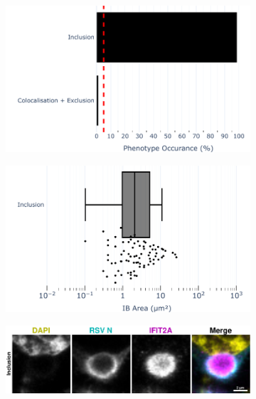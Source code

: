 \begin{figure}
    \begin{subfigure}{0.5\textwidth}
        \caption{}
        \includegraphics[width=1\linewidth]{10. Chapter 5/Figs/02. pIB/02. IFIT2A/01. bar_i2a_293t.pdf} 
    \end{subfigure}
    \begin{subfigure}{0.5\textwidth}
        \caption{}
        \includegraphics[width=1\linewidth]{10. Chapter 5/Figs/02. pIB/02. IFIT2A/02. box_i2a_293t.pdf}
    \end{subfigure}
    \begin{subfigure}{1\textwidth}
        \caption{}
        \includegraphics[width=1\linewidth]{10. Chapter 5/Figs/02. pIB/02. IFIT2A/03. i2a-293t-hnhp.pdf} 

\end{subfigure}
\end{figure}
